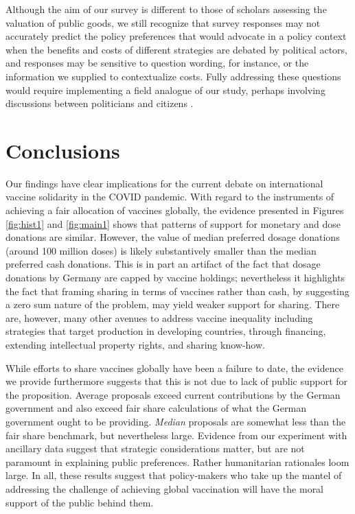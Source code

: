 \documentclass[]{article}
\begin{document}
Although the aim of our survey is different to those of scholars assessing the valuation of public goods, we still recognize that survey responses may not accurately predict the policy preferences that would advocate in a policy context when the benefits and costs of different strategies are debated by political actors, and responses may be sensitive to question wording, for instance, or the information we supplied to contextualize costs.  Fully addressing these questions would require implementing a field analogue of our study, perhaps involving discussions between politicians and citizens \citep{wuttke2021making}.
    

\section{Conclusions}


Our findings have clear implications for the current debate on international vaccine solidarity in the COVID pandemic. With regard to the instruments of achieving a fair allocation of vaccines globally, the evidence presented in Figures \ref{fig:hist1} and \ref{fig:main1} shows that patterns of support for monetary and dose donations are similar. However, the value of median preferred dosage donations (around 100 million doses) is likely substantively smaller than the median preferred cash donations. This is in part an artifact of the fact that dosage donations by Germany are capped by vaccine holdings; nevertheless it highlights the fact that framing sharing in terms of vaccines rather than cash, by suggesting a zero sum nature of the problem, may yield weaker support for sharing. There are, however, many other avenues to address vaccine inequality including strategies that target production in developing countries, through financing, extending intellectual property rights, and sharing know-how.



While efforts to share vaccines globally have been a failure to date, the evidence we provide furthermore suggests that this is not due to lack of public support for the proposition. Average proposals exceed current contributions by the German government and also exceed fair share calculations of what the German government ought to be providing. \textit{Median} proposals are somewhat less than the fair share benchmark, but nevertheless large. Evidence from our experiment with ancillary data suggest that strategic considerations matter, but are not paramount in explaining public preferences. Rather humanitarian rationales loom large. In all, these results suggest that policy-makers who take up the mantel of addressing the challenge of achieving global vaccination will have the moral support of the public behind them.
\end{document}
